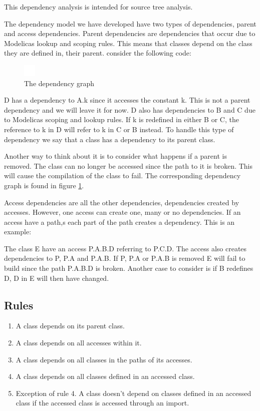 \documentclass{cslthse-msc}
\begin{document}
This dependency analysis is intended for source tree analysis.

The dependency model we have developed have two types of dependencies, parent and access dependencies. Parent dependencies are dependencies that occur due to Modelicas lookup and scoping rules. This means that classes depend on the class they are defined in, their parent. consider the following code:


\begin{figure}
    \centering
    \includegraphics[]{EPS-graphs/parent1.eps}
  \caption{The dependency graph}
  \label{fig:parent1graph}
\end{figure}

D has a dependency to A.k since it accesses the constant k. This is not a parent dependency and we will leave it for now. D also has dependencies to B and C due to Modelicas scoping and lookup rules. If k is redefined in either B or C, the reference to k in D will refer to k in C or B instead. To handle this type of dependency we say that a class has a dependency to its parent class.

Another way to think about it is to consider what happens if a parent is removed. The class can no longer be accessed since the path to it is broken. This will cause the compilation of the class to fail. The corresponding dependency graph is found in figure \ref{fig:parent1graph}.

Access dependencies are all the other dependencies, dependencies created by accesses. However, one access can create one, many or no dependencies. If an access have a path,s each part of the path creates a dependency. This is an example:

The class E have an access P.A.B.D referring to P.C.D. The access also creates dependencies to P, P.A and P.A.B. If P, P.A or P.A.B is removed E will fail to build since the path P.A.B.D is broken. Another case to consider is if B redefines D, D in E will then have changed.


\subsection{Rules}
\begin{enumerate}
\item A class depends on its parent class. 
\item A class depends on all accesses within it.
\item A class depends on all classes in the paths of its accesses.
\item A class depends on all classes defined in an accessed class.
\item Exception of rule 4. A class doesn't depend on classes defined in an accessed class if the accessed class is accessed through an import.
\end{enumerate}
\end{document}
